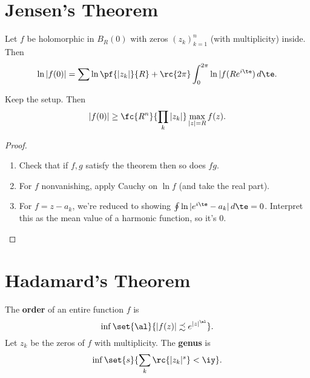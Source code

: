 \def\filepath{C:/Users/Owner/Dropbox/Math/templates}





%


%

\pagestyle{fancy}
\chead{} 
\rhead{} 
\lfoot{} 
\cfoot{\thepage} 
\rfoot{} 
\renewcommand{\headrulewidth}{.3pt} 
\setlength\voffset{0in}
\setlength\textheight{648pt}


\section{Jensen's Theorem}
\begin{thm}
Let $f$ be holomorphic in $B_R(0)$ with zeros $(z_k)_{k=1}^n$ (with multiplicity) inside. Then
\[
\ln |f(0)| = \sum \ln \pf{|z_k|}{R} + \rc{2\pi}\int_0^{2\pi} \ln |f(Re^{i\te})\,d\te.
\]
\end{thm}
\begin{cor}
Keep the setup. Then
\[
|f(0)|\ge \fc{R^n}{\prod_k |z_k|} \max_{|z|=R}f(z).
\]
\end{cor}
\begin{proof}
\begin{enumerate}
\item
Check that if $f,g$ satisfy the theorem then so does $fg$.
\item 
For $f$ nonvanishing, apply Cauchy on $\ln f$ (and take the real part).
\item
For $f=z-a_k$, we're reduced to showing $\oint \ln |e^{i\te}-a_k|\,d\te=0$. Interpret this as the mean value of a harmonic function, so it's 0.
\end{enumerate}
\end{proof}

\section{Hadamard's Theorem}

\begin{df}
The \textbf{order} of an entire function $f$ is 
\[
\inf \set{\al}{|f(z)|\precsim e^{|z|^{\al}}}.
\]
Let $z_k$ be the zeros of $f$ with multiplicity. The \textbf{genus} is 
\[
\inf \set{s}{\sum_k \rc{|z_k|^s}<\iy}.
\]
\end{df}

